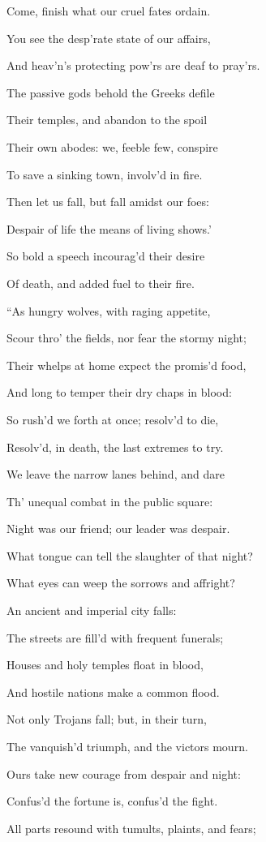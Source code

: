 Come, finish what our cruel fates ordain.

You see the desp’rate state of our affairs,

And heav’n’s protecting pow’rs are deaf to pray’rs.

The passive gods behold the Greeks defile

Their temples, and abandon to the spoil

Their own abodes: we, feeble few, conspire

To save a sinking town, involv’d in fire.

Then let us fall, but fall amidst our foes:

Despair of life the means of living shows.’

So bold a speech incourag’d their desire

Of death, and added fuel to their fire.

“As hungry wolves, with raging appetite,

Scour thro’ the fields, nor fear the stormy night;

Their whelps at home expect the promis’d food,

And long to temper their dry chaps in blood:

So rush’d we forth at once; resolv’d to die,

Resolv’d, in death, the last extremes to try.

We leave the narrow lanes behind, and dare

Th’ unequal combat in the public square:

Night was our friend; our leader was despair.

What tongue can tell the slaughter of that night?

What eyes can weep the sorrows and affright?

An ancient and imperial city falls:

The streets are fill’d with frequent funerals;

Houses and holy temples float in blood,

And hostile nations make a common flood.

Not only Trojans fall; but, in their turn,

The vanquish’d triumph, and the victors mourn.

Ours take new courage from despair and night:

Confus’d the fortune is, confus’d the fight.

All parts resound with tumults, plaints, and fears;

